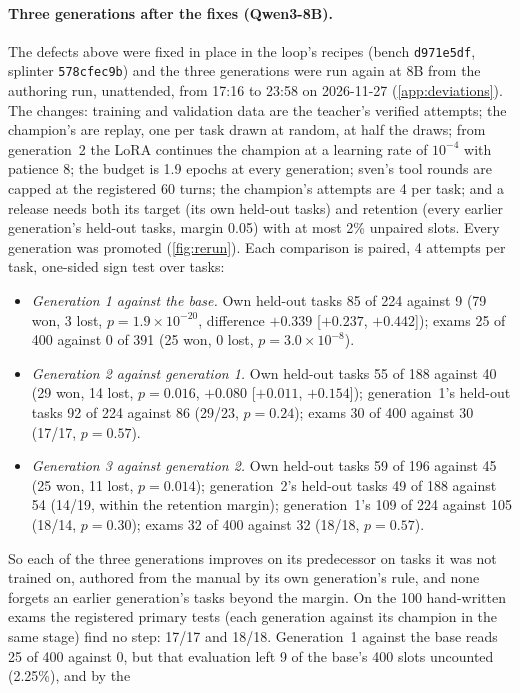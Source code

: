 \paragraph{Three generations after the fixes (Qwen3-8B).} The defects above were fixed in place in the loop's recipes
(bench \texttt{d971e5df}, splinter \texttt{578cfec9b}) and the three generations were run again at 8B from the authoring run,
unattended, from 17:16 to 23:58 on 2026-11-27 (\cref{app:deviations}). The changes: training and validation data are the
teacher's verified attempts; the champion's are replay, one per task drawn at random, at half the draws; from generation~2
the LoRA continues the champion at a learning rate of $10^{-4}$ with patience 8; the budget is 1.9 epochs at every
generation; sven's tool rounds are capped at the registered 60 turns; the champion's attempts are 4 per task; and a release
needs both its target (its own held-out tasks) and retention (every earlier generation's held-out tasks, margin 0.05) with at
most 2\% unpaired slots. Every generation was promoted (\cref{fig:rerun}). Each comparison is paired, 4 attempts per task, one-sided sign test
over tasks:
\begin{itemize}
\item \emph{Generation 1 against the base.} Own held-out tasks 85 of 224 against 9 (79 won, 3 lost, $p=1.9\times10^{-20}$,
  difference $+0.339$ [$+0.237$, $+0.442$]); exams 25 of 400 against 0 of 391 (25 won, 0 lost, $p=3.0\times10^{-8}$).
\item \emph{Generation 2 against generation 1.} Own held-out tasks 55 of 188 against 40 (29 won, 14 lost, $p=0.016$,
  $+0.080$ [$+0.011$, $+0.154$]); generation~1's held-out tasks 92 of 224 against 86 (29/23, $p=0.24$); exams 30 of 400
  against 30 (17/17, $p=0.57$).
\item \emph{Generation 3 against generation 2.} Own held-out tasks 59 of 196 against 45 (25 won, 11 lost, $p=0.014$);
  generation~2's held-out tasks 49 of 188 against 54 (14/19, within the retention margin); generation~1's 109 of 224 against
  105 (18/14, $p=0.30$); exams 32 of 400 against 32 (18/18, $p=0.57$).
\end{itemize}
So each of the three generations improves on its predecessor on tasks it was not trained on, authored from the manual by its
own generation's rule, and none forgets an earlier generation's tasks beyond the margin. On the 100 hand-written exams the
registered primary tests (each generation against its champion in the same stage) find no step: 17/17 and 18/18. Generation~1
against the base reads 25 of 400 against 0, but that evaluation left 9 of the base's 400 slots uncounted (2.25\%), and by the

